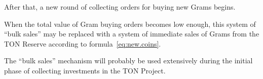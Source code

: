 \documentclass[12pt,oneside]{article}
\begin{document}
After that, a new round of collecting orders for buying new Grams
begins.

When the total value of Gram buying orders becomes low enough, this
system of ``bulk sales'' may be replaced with a system of immediate
sales of Grams from the TON Reserve according to
formula~\eqref{eq:new.coins}.

The ``bulk sales'' mechanism will probably be used extensively during
the initial phase of collecting investments in the TON Project.
\end{document}
